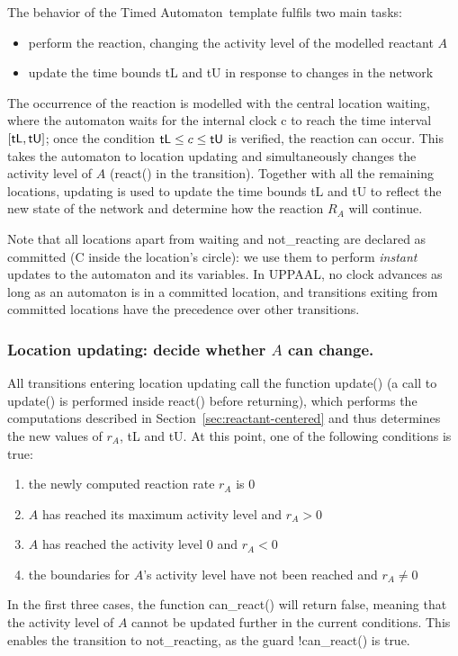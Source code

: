 \documentclass{llncs}
\newcommand{\ta}{Timed Automaton}
\begin{document}
The behavior of the \ta\ template fulfils two main tasks:
\begin{itemize}
  \item perform the reaction, changing the activity level of the modelled reactant $A$
  \item update the time bounds {\sf tL} and {\sf tU} in response to changes in the network
\end{itemize}
The occurrence of the reaction is modelled with the central location {\sf waiting}, where the automaton
waits for the internal clock {\sf c} to reach the time interval $[{\sf tL}, {\sf tU}]$; once
the condition ${\sf tL} \leq c \leq {\sf tU}$
is verified, the reaction can occur.
This takes the automaton
to location {\sf updating} and simultaneously changes the activity level of $A$ ({\sf react()} in the transition).
Together with all the remaining locations, {\sf updating} is used to update the
time bounds {\sf tL} and {\sf tU} to reflect the new state of the network and determine
how the reaction $R_A$ will continue.

Note that all locations apart from {\sf waiting} and {\sf not\_reacting} are
declared as committed ({\sf C} inside the location's circle): we use them to perform \emph{instant} updates
to the automaton and its variables. In UPPAAL, no clock advances as long as an automaton is in a committed
location, and transitions exiting from committed locations have the precedence over other transitions.


\subsubsection{Location {\sf updating}: decide whether $A$ can change.}
All transitions entering location {\sf updating} call the function {\sf update()} (a call to {\sf update()}
is performed inside {\sf react()} before returning), which performs the computations described
in Section~\ref{sec:reactant-centered} and thus determines the new values of $r_A$, {\sf tL} and {\sf tU}. At this
point, one of the following conditions is true:
\begin{enumerate}
  \item the newly computed reaction rate $r_A$ is 0
  \item $A$ has reached its maximum activity level and $r_A > 0$
  \item $A$ has reached the activity level 0 and $r_A < 0$
  \item the boundaries for $A$'s activity level have not been reached and $r_A \neq 0$
\end{enumerate}
In the first three cases, the function {\sf can\_react()} will return false, meaning that
the activity level of $A$ cannot be updated further in the current conditions. This enables the transition to
{\sf not\_reacting}, as the guard {\sf !can\_react()} is true.
\end{document}
